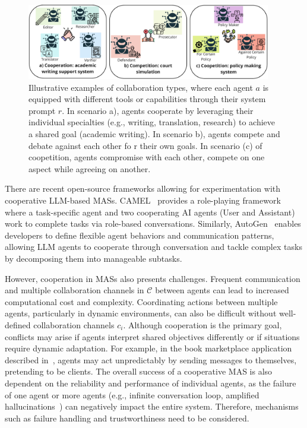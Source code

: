 \documentclass[acmsmall,nonacm]{acmart}
\begin{document}
        \begin{figure}
            \includegraphics[width=0.95\textwidth]{image-lib/collaboration_types.pdf}
            \caption{Illustrative examples of collaboration types, where each agent $a$ is equipped with different tools or capabilities through their system prompt $r$. In scenario a), agents cooperate by leveraging their individual specialties (e.g., writing, translation, research) to achieve a shared goal (academic writing). In scenario b), agents compete and debate against each other fo
            r their own goals. In scenario (c) of coopetition, agents compromise with each other, compete on one aspect while agreeing on another. %
            }
            \label{fig:collaboration_types}
            \Description{}
        \end{figure}
            
            There are recent open-source frameworks allowing for experimentation with cooperative LLM-based MASs. CAMEL~\cite{li2023camel} provides a role-playing framework where a task-specific agent and two cooperating AI agents (User and Assistant) work to complete tasks via role-based conversations. Similarly, AutoGen~\cite{wu2024autogen} enables developers to define flexible agent behaviors and communication patterns, allowing LLM agents to cooperate through conversation and tackle complex tasks by decomposing them into manageable subtasks.
            
            However, cooperation in MASs also presents challenges. Frequent communication and multiple collaboration channels in $\mathcal{C}$ between agents can lead to increased computational cost and complexity. Coordinating actions between multiple agents, particularly in dynamic environments, can also be difficult without well-defined collaboration channels $c_i$. Although cooperation is the primary goal, conflicts may arise if agents interpret shared objectives differently or if situations require dynamic adaptation. For example, in the book marketplace application described in~\cite{nascimento2023self}, agents may act unpredictably by sending messages to themselves, pretending to be clients. The overall success of a cooperative MAS is also dependent on the reliability and performance of individual agents, as the failure of one agent or more agents (e.g., infinite conversation loop, amplified hallucinations~\cite{hong2024metagpt}) can negatively impact the entire system. Therefore, mechanisms such as failure handling and trustworthiness need to be considered.
\end{document}
